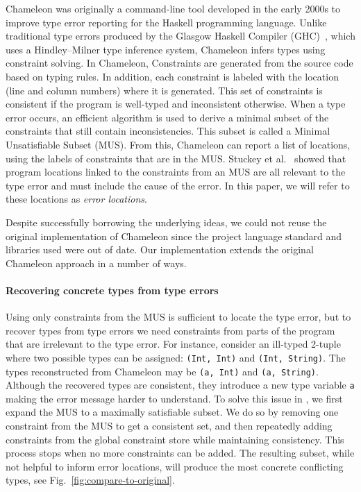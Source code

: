 Chameleon was originally a command-line tool developed in the early 2000s to improve type error reporting %
for the Haskell programming language.
Unlike traditional type errors produced by the Glasgow Haskell Compiler (GHC)~\cite{ben_gamari_home_2022}, which uses a Hindley–Milner type inference system, Chameleon infers types using constraint solving. In Chameleon, Constraints are generated from the source code based on typing rules. In addition, each constraint is labeled with the location (line and column numbers) where it is generated. This set of constraints is consistent if the program is well-typed and inconsistent otherwise. When a type error occurs, an efficient algorithm is used to derive a minimal subset of the constraints that still contain inconsistencies. This subset is called a Minimal Unsatisfiable Subset (MUS). From this, Chameleon can report a list of locations, using the labels of constraints that are in the MUS. Stuckey et al.~\cite{stuckey_interactive_2003} showed that program locations linked to the constraints from an MUS are all relevant to the type error and must include the cause of the error. In this paper, we will refer to these locations as \textit{error locations}.

Despite successfully borrowing the underlying ideas, we could not reuse the original implementation of Chameleon since the project language standard and libraries used were out of date. 
Our \chameleon{} implementation extends the original Chameleon approach in a number of ways.



\paragraph{Recovering concrete types from type errors}


Using only constraints from the MUS is sufficient to locate the type error, but to recover types from type errors we need  constraints from parts of the program that are irrelevant to the type error.  For instance, consider an ill-typed 2-tuple where two possible types can be assigned: \texttt{(Int, Int)} and \texttt{(Int, String)}. The types reconstructed from Chameleon may be \texttt{(a, Int)} and \texttt{(a, String)}. Although the recovered types are consistent, they introduce a new type variable \texttt{a} making the error message harder to understand.  To solve this issue in \chameleon{}, we first expand the MUS to a maximally satisfiable subset. We do so by removing one constraint from the MUS to get a consistent set, and then repeatedly adding constraints from the global constraint store while maintaining consistency. This process stops when no more constraints can be added. The resulting subset, while not helpful to inform error locations, will produce the most concrete conflicting types, see Fig.~\ref{fig:compare-to-original}. 


